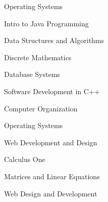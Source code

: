 

\begin{minipage}[t]{.3\linewidth}
  {\color[HTML]{3d3d3d}\begin{cvitems}
  \footnotesize \let\small\footnotesize
  \item Operating Systems
    \item Intro to Java Programming
    \item Data Structures and Algorithms
    \item Discrete Mathematics
  \end{cvitems}}
\end{minipage}%
\begin{minipage}[t]{.3\linewidth}
  \begin{cvitems}
  \footnotesize \let\small\footnotesize
    \item Database Systems
    \item Software Development in C++
    \item Computer Organization
    \item Operating Systems
  \end{cvitems}
\end{minipage}%
\begin{minipage}[t]{.3\linewidth}
  \begin{cvitems}
  \footnotesize \let\small\footnotesize
  \item Web Development and Design
    \item Calculus One
    \item Matrices and Linear Equations
    \item Web Design and Development 
  \end{cvitems}
\end{minipage}